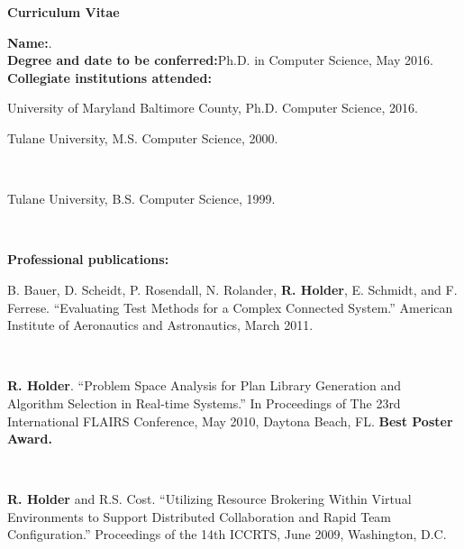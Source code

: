 \begin{titlepage}

\begin{center}
\vspace{0.1in}
\large{\bf Curriculum Vitae}
\bigskip \bigskip
\end{center}

\begin{flushleft}
  {\bf Name:}{\hspace{3mm}}\fullname{}.\\
	{\bf Degree and date to be conferred:}{\hspace{3mm}}Ph.D. in Computer Science, May 2016. \\
	{\bf Collegiate institutions attended:}\\
	\begin{singlespace} 
	{\hspace{0.4in}}University of Maryland Baltimore County, Ph.D. Computer Science, 2016. \\
	{\hspace{0.4in}}\parbox[t]{5.5in}{Tulane University, M.S. Computer Science, 2000.} \\
        {\hspace{0.4in}}\parbox[t]{5.5in}{Tulane University, B.S. Computer Science, 1999.} \\
	\end{singlespace} 
	\vspace{8pt}
	{\bf Professional publications:}\\
	\begin{singlespace} 
{\hspace{0.4in}} \parbox[t]{5.5in}{B. Bauer, D. Scheidt, P. Rosendall, N. Rolander, \textbf{R. Holder}, E. Schmidt, and F. Ferrese.  ``Evaluating Test Methods for a Complex Connected System.''  American Institute of Aeronautics and Astronautics, March 2011.}\\
{\vspace{5pt}}

{\hspace{0.4in}} \parbox[t]{5.5in}{\textbf{R. Holder}.  ``Problem Space Analysis for Plan Library Generation and Algorithm Selection in
Real-time Systems.'' In Proceedings of The 23rd International FLAIRS Conference, May 2010, Daytona Beach, FL.  \textbf{Best Poster Award.}}\\
{\vspace{5pt}}

{\hspace{0.4in}} \parbox[t]{5.5in}{\textbf{R. Holder} and R.S. Cost.  ``Utilizing Resource Brokering Within Virtual Environments to Support Distributed Collaboration and Rapid Team Configuration.'' Proceedings of the 14th ICCRTS, June 2009, Washington, D.C.}\\
{\vspace{5pt}}


\end{singlespace}
\end{flushleft}
\end{titlepage}
